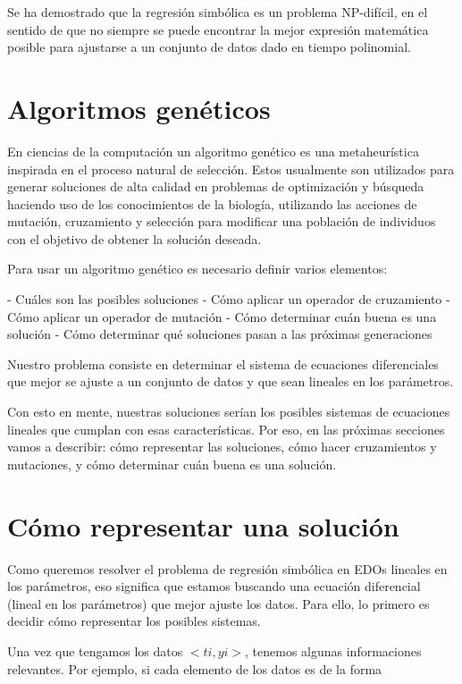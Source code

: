 Se ha demostrado que la regresión simbólica es un problema NP-difícil, en el sentido de que no siempre se puede encontrar la mejor expresión matemática posible para ajustarse a un conjunto de datos dado en tiempo polinomial.

\section{Algoritmos genéticos}

En ciencias de la computación un algoritmo genético es una metaheurística inspirada en el proceso natural de selección. Estos usualmente son utilizados para generar soluciones de alta calidad en problemas de optimización y búsqueda haciendo uso de los conocimientos de la biología, utilizando las acciones de mutación, cruzamiento y selección para modificar una población de individuos con el objetivo de obtener la solución deseada.

Para usar un algoritmo genético es necesario definir varios elementos:

- Cuáles son las posibles soluciones
- Cómo aplicar un operador de cruzamiento
- Cómo aplicar un operador de mutación
- Cómo determinar cuán buena es una solución
- Cómo determinar qué soluciones pasan a las próximas generaciones

Nuestro problema consiste en determinar el sistema de ecuaciones diferenciales que mejor se ajuste a un conjunto de datos y que sean lineales en los parámetros.

Con esto en mente, nuestras soluciones serían los posibles sistemas de ecuaciones lineales que cumplan con esas características. Por eso, en las próximas secciones vamos a describir: cómo representar las soluciones, cómo hacer cruzamientos y mutaciones, y cómo determinar cuán buena es una solución.

\section{Cómo representar una solución}

Como queremos resolver el problema de regresión simbólica en EDOs lineales en los parámetros, eso significa que estamos buscando una ecuación diferencial (lineal en los parámetros) que mejor ajuste los datos. Para ello, lo primero es decidir cómo representar los posibles sistemas.

Una vez que tengamos los datos $<ti, yi>$, tenemos algunas informaciones relevantes. Por ejemplo, si cada elemento de los datos es de la forma

